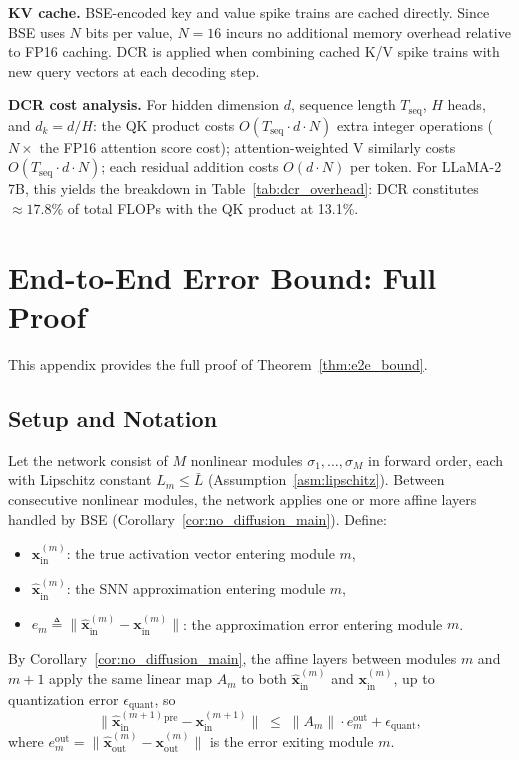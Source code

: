 \documentclass{article}
\theoremstyle{plain}
\theoremstyle{definition}
\theoremstyle{remark}
\begin{document}
\noindent\textbf{KV cache.}
BSE-encoded key and value spike trains are cached directly. Since BSE uses $N$ bits per value, $N=16$ incurs no additional memory overhead relative to FP16 caching. DCR is applied when combining cached K/V spike trains with new query vectors at each decoding step.

\noindent\textbf{DCR cost analysis.}
For hidden dimension $d$, sequence length $T_\mathrm{seq}$, $H$ heads, and $d_k = d/H$: the QK product costs $O(T_\mathrm{seq} \cdot d \cdot N)$ extra integer operations ($N\times$ the FP16 attention score cost); attention-weighted V similarly costs $O(T_\mathrm{seq} \cdot d \cdot N)$; each residual addition costs $O(d \cdot N)$ per token. For LLaMA-2 7B, this yields the breakdown in Table~\ref{tab:dcr_overhead}: DCR constitutes $\approx\!17.8\%$ of total FLOPs with the QK product at 13.1\%.

\section{End-to-End Error Bound: Full Proof}
\label{app:e2e_proof}

This appendix provides the full proof of Theorem~\ref{thm:e2e_bound}.

\subsection{Setup and Notation}

Let the network consist of $M$ nonlinear modules $\sigma_1, \ldots, \sigma_M$ in
forward order, each with Lipschitz constant $L_m \le \bar{L}$ (Assumption~\ref{asm:lipschitz}).
Between consecutive nonlinear modules, the network applies one or more affine layers
handled by BSE (Corollary~\ref{cor:no_diffusion_main}). Define:
\begin{itemize}
  \item $\mathbf{x}^{(m)}_\mathrm{in}$: the true activation vector entering module $m$,
  \item $\hat{\mathbf{x}}^{(m)}_\mathrm{in}$: the SNN approximation entering module $m$,
  \item $e_m \triangleq \|\hat{\mathbf{x}}^{(m)}_\mathrm{in} - \mathbf{x}^{(m)}_\mathrm{in}\|$:
        the approximation error entering module $m$.
\end{itemize}
By Corollary~\ref{cor:no_diffusion_main}, the affine layers between modules $m$ and
$m+1$ apply the same linear map $A_m$ to both $\hat{\mathbf{x}}^{(m)}_\mathrm{in}$
and $\mathbf{x}^{(m)}_\mathrm{in}$, up to quantization error $\epsilon_\mathrm{quant}$,
so
\begin{equation}
\label{eq:linear_passthrough}
\|\hat{\mathbf{x}}^{(m+1)}_\mathrm{in}^\mathrm{pre} - \mathbf{x}^{(m+1)}_\mathrm{in}\|
\;\le\; \|A_m\| \cdot e_m^\mathrm{out} + \epsilon_\mathrm{quant},
\end{equation}
where $e_m^\mathrm{out} = \|\hat{\mathbf{x}}^{(m)}_\mathrm{out} -
\mathbf{x}^{(m)}_\mathrm{out}\|$ is the error exiting module $m$.
\end{document}
